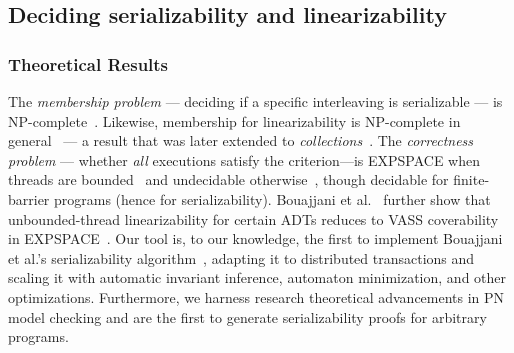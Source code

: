 \subsection{Deciding serializability and linearizability}

\subsubsection{Theoretical Results}
The \emph{membership problem} --- deciding if a specific interleaving is serializable --- is NP-complete~\cite{Pa79,BiEn19}. Likewise, membership for linearizability is NP-complete in general~\cite{GiKo97} --- a result that was later 
extended to \textit{collections}~\cite{EmEn18}. The \emph{correctness problem} --- whether \emph{all} executions satisfy the criterion—is EXPSPACE when threads are bounded~\cite{AlMcPe96} and undecidable otherwise~\cite{BoEmEnHa13}, though decidable for finite-barrier programs (hence for serializability). Bouajjani et al.~\cite{BoEmEnHa18} further show that unbounded-thread linearizability for certain ADTs reduces to VASS coverability in EXPSPACE~\cite{Ra78}. Our tool is, to our knowledge, the first to implement Bouajjani et al.’s serializability algorithm~\cite{BoEmEnHa13}, adapting it to distributed transactions and scaling it with automatic invariant inference, automaton minimization, and other optimizations. Furthermore, we harness research theoretical advancements in PN model checking and are the first to generate serializability proofs for arbitrary programs.

